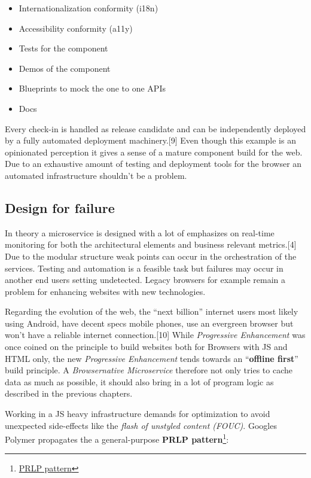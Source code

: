 \documentclass[]{article}
\providecommand{\tightlist}{%
  \setlength{\itemsep}{0pt}\setlength{\parskip}{0pt}}
\begin{document}
\begin{itemize}
\tightlist
\item
  Internationalization conformity (i18n)
\item
  Accessibility conformity (a11y)
\item
  Tests for the component
\item
  Demos of the component
\item
  Blueprints to mock the one to one APIs
\item
  Docs
\end{itemize}

Every check-in is handled as release candidate and can be independently
deployed by a fully automated deployment machinery.{[}9{]} Even though
this example is an opinionated perception it gives a sense of a mature
component build for the web. Due to an exhaustive amount of testing and
deployment tools for the browser an automated infrastructure shouldn't
be a problem.

\subsection{Design for failure}\label{design-for-failure}

In theory a microservice is designed with a lot of emphasizes on
real-time monitoring for both the architectural elements and business
relevant metrics.{[}4{]} Due to the modular structure weak points can
occur in the orchestration of the services. Testing and automation is a
feasible task but failures may occur in another end users setting
undetected. Legacy browsers for example remain a problem for enhancing
websites with new technologies.

Regarding the evolution of the web, the ``next billion'' internet users
most likely using Android, have decent specs mobile phones, use an
evergreen browser but won't have a reliable internet connection.{[}10{]}
While \emph{Progressive Enhancement} was once coined on the principle to
build websites both for Browsers with JS and HTML only, the new
\emph{Progressive Enhancement} tends towards an ``\textbf{offline
first}'' build principle. A \emph{Browsernative Microservice} therefore
not only tries to cache data as much as possible, it should also bring
in a lot of program logic as described in the previous chapters.

Working in a JS heavy infrastructure demands for optimization to avoid
unexpected side-effects like the \emph{flash of unstyled content
(FOUC)}. Googles Polymer propagates the a general-purpose \textbf{PRLP
pattern}\footnote{\href{https://www.polymer-project.org/1.0/toolbox/server}{PRLP
  pattern}}:
\end{document}
